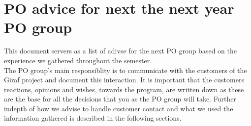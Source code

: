 \section{PO advice for next the next year PO group} \label{appendix:PO-advise}
This document servers as a list of adivse for the next PO group based on the experience we gathered throughout the semester.
\\
The PO group's main responsiblity is to communicate with the customers of the Giraf project and document this interaction.
It is important that the customers reactions, opinions and wishes, towards the program, are written down as these are the base for all the decisions that you as the PO group will take.
Further indepth of how we advise to handle customer contact and what we used the information gathered is described in the following sections.

